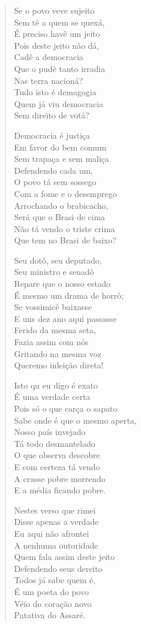 \begin{verse}
Se o povo veve sujeito\\
Sem tê a quem se quexá,\\
É preciso havê um jeito\\
Pois deste jeito não dá,\\
Cadê a democracia\\
Que o pudê tanto irradia\\
Nas terra nacioná?\\
Tudo isto é demagogia\\
Quem já viu democracia\\
Sem direito de votá?

Democracia é justiça\\
Em favor do bem comum\\
Sem trapaça e sem maliça\\
Defendendo cada um,\\
O povo tá sem sossego\\
Com a fome e o desemprego\\
Arrochando o brabicacho,\\
Será que o Brasi de cima\\
Não tá vendo o triste crima\\
Que tem no Brasi de baixo?

Seu dotô, seu deputado,\\
Seu ministro e senadô\\
Repare que o nosso estado\\
É mesmo um drama de horrô;\\
Se vossimicê baixasse\\
E uns dez ano aqui passasse\\
Ferido da mesma seta,\\
Fazia assim com nós\\
Gritando na mesma voz\\
Queremo inleição direta!

Isto qu eu digo é exato\\
É uma verdade certa\\
Pois só o que carça o sapato\\
Sabe onde é que o mesmo aperta,\\
Nosso país invejado\\
Tá todo desmantelado\\
O que observa descobre\\
E com certeza tá vendo\\
A crasse pobre morrendo\\
E a média ficando pobre.

Nestes verso que rimei\\
Disse apenas a verdade\\
Eu aqui não afrontei\\
A nenhuma outoridade\\
Quem fala assim deste jeito\\
Defendendo seus dereito\\
Todos já sabe quem é,\\
É um poeta do povo\\
Véio do coração novo\\
Patativa do Assaré.
\end{verse}

